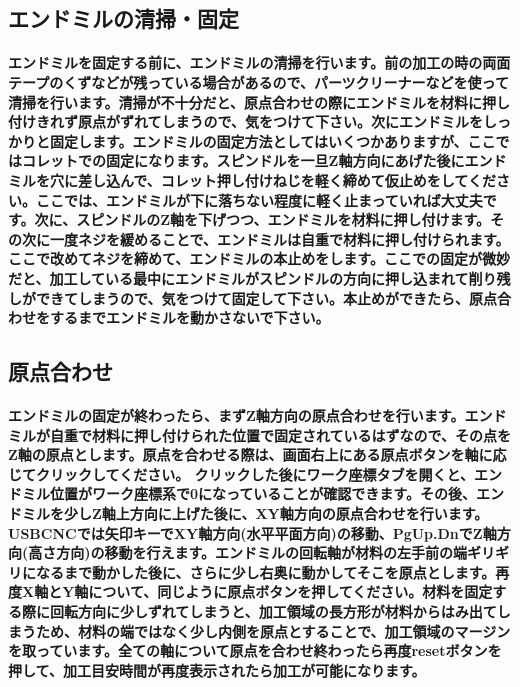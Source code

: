 \documentclass[b5paper, 9pt, twocolumn, titlepage,openany]{jsbook}%
\begin{document}

\subsection{エンドミルの清掃・固定}
\paragraph{エンドミルを固定する前に、エンドミルの清掃を行います。前の加工の時の両面テープのくずなどが残っている場合があるので、パーツクリーナーなどを使って清掃を行います。清掃が不十分だと、原点合わせの際にエンドミルを材料に押し付けきれず原点がずれてしまうので、気をつけて下さい。次にエンドミルをしっかりと固定します。エンドミルの固定方法としてはいくつかありますが、ここではコレットでの固定になります。スピンドルを一旦Z軸方向にあげた後にエンドミルを穴に差し込んで、コレット押し付けねじを軽く締めて仮止めをしてください。ここでは、エンドミルが下に落ちない程度に軽く止まっていれば大丈夫です。次に、スピンドルのZ軸を下げつつ、エンドミルを材料に押し付けます。その次に一度ネジを緩めることで、エンドミルは自重で材料に押し付けられます。ここで改めてネジを締めて、エンドミルの本止めをします。ここでの固定が微妙だと、加工している最中にエンドミルがスピンドルの方向に押し込まれて削り残しができてしまうので、気をつけて固定して下さい。本止めができたら、原点合わせをするまでエンドミルを動かさないで下さい。}


\subsection{原点合わせ}
\paragraph{エンドミルの固定が終わったら、まずZ軸方向の原点合わせを行います。エンドミルが自重で材料に押し付けられた位置で固定されているはずなので、その点をZ軸の原点とします。原点を合わせる際は、画面右上にある原点ボタンを軸に応じてクリックしてください。 クリックした後にワーク座標タブを開くと、エンドミル位置がワーク座標系で0になっていることが確認できます。その後、エンドミルを少しZ軸上方向に上げた後に、XY軸方向の原点合わせを行います。USBCNCでは矢印キーでXY軸方向(水平平面方向)の移動、PgUp.DnでZ軸方向(高さ方向)の移動を行えます。エンドミルの回転軸が材料の左手前の端ギリギリになるまで動かした後に、さらに少し右奥に動かしてそこを原点とします。再度X軸とY軸について、同じように原点ボタンを押してください。材料を固定する際に回転方向に少しずれてしまうと、加工領域の長方形が材料からはみ出てしまうため、材料の端ではなく少し内側を原点とすることで、加工領域のマージンを取っています。全ての軸について原点を合わせ終わったら再度resetボタンを押して、加工目安時間が再度表示されたら加工が可能になります。}
\end{document}
